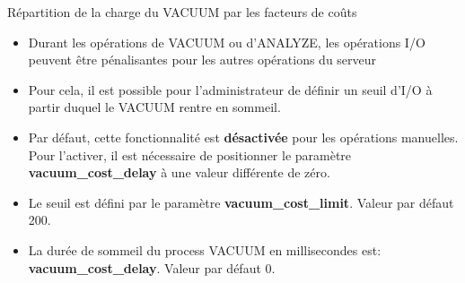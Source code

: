 
\begin{frame}{Répartition de la charge du VACUUM par les facteurs de coûts}

\begin{itemize}
   \item Durant les opérations de VACUUM ou d'ANALYZE, les opérations I/O peuvent être pénalisantes pour les autres opérations du serveur
   \item Pour cela, il est possible pour l'administrateur de définir un seuil d'I/O à partir duquel le VACUUM rentre en sommeil.
   \item Par défaut, cette fonctionnalité est \textbf{désactivée} pour les opérations manuelles. Pour l'activer, il est nécessaire de positionner le paramètre \textbf{vacuum\_cost\_delay} à une valeur différente de zéro.
   \item Le seuil est défini par le paramètre \textbf{vacuum\_cost\_limit}. Valeur par défaut 200.
   \item La durée de sommeil du process VACUUM en millisecondes est: \textbf{vacuum\_cost\_delay}. Valeur par défaut 0.

\end{itemize}

\begin{tiny}
\begin{toile}
\end{toile}
\end{tiny}

\end{frame}


